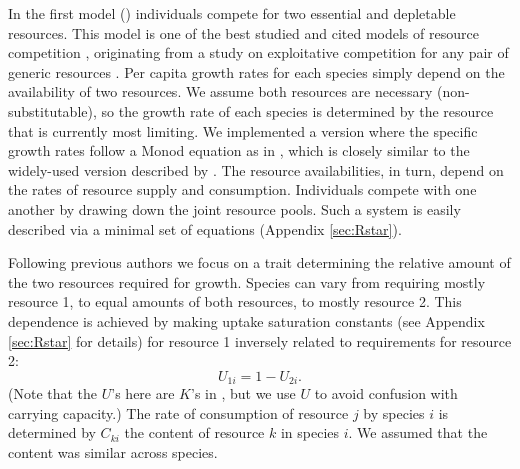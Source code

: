\documentclass[a4paper,11pt]{article}
\begin{document}
In the first model (\Rstar) individuals compete for two essential and
depletable resources. This model is one of the best studied and cited
models of resource competition \citep{Tilman-1977, Tilman-1982,
  Huisman-2001}, originating from a study on exploitative competition
for any pair of generic resources \citep{Leon-1975}. Per capita growth rates for each species simply depend on the availability of two resources.  We assume both
resources are necessary (non-substitutable), so the growth rate
of each species is determined by the resource that is currently most
limiting.  We implemented a version where the specific growth rates
follow a Monod equation as in \citet{Huisman-2001}, which is closely
similar to the widely-used version described by \citet{Tilman-1977,
  Tilman-1982}.
 The resource availabilities, in turn, depend on the
rates of resource supply and consumption. Individuals compete with one
another by drawing down the joint resource pools. Such a system is
easily described via a minimal set of equations (Appendix
\ref{sec:Rstar}).

Following previous authors \citep{Tilman-1985, Schreiber-2003,
  Fox-2008} we focus on a trait determining the relative amount of the
two resources required for growth. Species can vary from requiring
mostly resource 1, to equal amounts of both resources, to mostly
resource 2. This dependence is achieved by making uptake saturation
constants (see Appendix \ref{sec:Rstar} for details) for resource 1
inversely related to requirements for resource 2:
\begin{equation}
\label{eq:R3}
U_{1i} = 1 - U_{2i}.
\end{equation}
(Note that the $U$'s here are $K$'s in \citet{Huisman-2001}, but we
use $U$ to avoid confusion with carrying capacity.)
%
The rate of consumption of resource $j$ by species $i$ is determined by
$C_{ki}$ the content of resource $k$ in species $i$. We assumed that
the content was similar across species.

%
\end{document}
